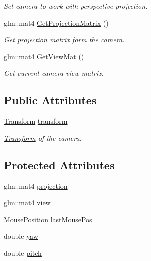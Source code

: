 \begin{DoxyCompactItemize}
\begin{DoxyCompactList}\small\item\em Set camera to work with perspective projection. \end{DoxyCompactList}\item 
glm\+::mat4 \mbox{\hyperlink{class_camera_ab0a4bf5a65d45f25529e3cffda1c361b}{Get\+Projection\+Matrix}} ()
\begin{DoxyCompactList}\small\item\em Get projection matrix form the camera. \end{DoxyCompactList}\item 
glm\+::mat4 \mbox{\hyperlink{class_camera_a06b3f8e75270f4f2415f8591a315f231}{Get\+View\+Mat}} ()
\begin{DoxyCompactList}\small\item\em Get current camera view matrix. \end{DoxyCompactList}\end{DoxyCompactItemize}
\subsection*{Public Attributes}
\begin{DoxyCompactItemize}
\item 
\mbox{\hyperlink{class_transform}{Transform}} \mbox{\hyperlink{class_camera_ad5cea63239e1519c1fe7d414f5e047a8}{transform}}
\begin{DoxyCompactList}\small\item\em \mbox{\hyperlink{class_transform}{Transform}} of the camera. \end{DoxyCompactList}\end{DoxyCompactItemize}
\subsection*{Protected Attributes}
\begin{DoxyCompactItemize}
\item 
glm\+::mat4 \mbox{\hyperlink{class_camera_a43555a0ae83f9ec696ee257e5fd48cf2}{projection}}
\item 
glm\+::mat4 \mbox{\hyperlink{class_camera_add93fedd6b9a6a6e2c784aeda624de83}{view}}
\item 
\mbox{\hyperlink{struct_mouse_position}{Mouse\+Position}} \mbox{\hyperlink{class_camera_a452e0aabdcd36e235c2f8705b736482c}{last\+Mouse\+Pos}}
\item 
double \mbox{\hyperlink{class_camera_a54536224732656e8f4a419cf11662d3e}{yaw}}
\item 
double \mbox{\hyperlink{class_camera_a481e669a6f96826929e323706543a6a4}{pitch}}
\end{DoxyCompactItemize}
